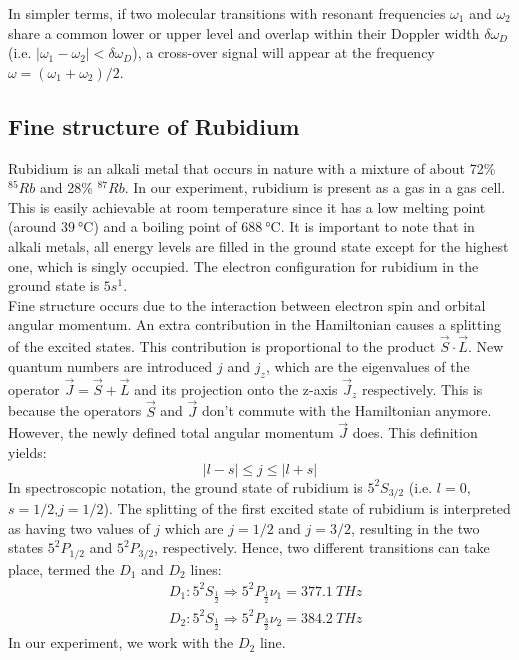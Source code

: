 \documentclass{article}
\begin{document}
In simpler terms, if two molecular transitions with resonant frequencies $\omega_1$ and $\omega_2$ share a common lower or upper level and overlap within their Doppler width $\delta\omega_D$ (i.e. $|{\omega_1 - \omega_2}| <\delta\omega_D$), a cross-over signal will appear at the frequency $\omega = (\omega_1 + \omega_2)/2$.
\pagebreak{}
\subsection{Fine structure of Rubidium}
Rubidium is an alkali metal that occurs in nature with a mixture of about 72\% $^{85}Rb$ and 28\% $^{87}Rb$. In our experiment, rubidium is present as a gas in a gas cell. This is easily achievable at room temperature since it has a low melting point (around $\SI{39}{\celsius}$) and a boiling point of $\SI{688}{\celsius}$. It is important to note that in alkali metals, all energy levels are filled in the ground state except for the highest one, which is singly occupied. The electron configuration for rubidium in the ground state is $5s^1$. 
\\
Fine structure occurs due to the interaction between electron spin and orbital angular momentum. An extra contribution in the Hamiltonian causes a splitting of the excited states. This contribution is proportional to the product $\vec{S}\cdot\vec{L}$. New quantum numbers are introduced $j$ and $j_z$, which are the eigenvalues of the operator $\vec{J}= \vec{S}+\vec{L}$ and its projection onto the z-axis $\vec{J}_z$ respectively. This is because the operators $\vec{S}$ and $\vec{J}$ don't commute with the Hamiltonian anymore. However, the newly defined total angular momentum $\vec{J}$ does. This definition yields: 
\begin{equation}
    |l-s| \leq j \leq|l+s|
\end{equation}
In spectroscopic notation, the ground state of rubidium is $5^2S_{3/2}$ (i.e. $l=0$,$s=1/2$,$j = 1/2$). The splitting of the first excited state of rubidium is interpreted as having two values of $j$ which are $j =1/2$ and $j =3/2$, resulting in the two states $5^2P_{1/2}$ and $5^2P_{3/2}$, respectively. Hence, two different transitions can take place, termed the $D_1$ and $D_2$ lines: 
\begin{equation}
    \begin{aligned}
& D_1: 5^2 S_{\frac{1}{2}} \Rightarrow 5^2 P_{\frac{1}{2}} \nu_{1}=\SI{377.1}{THz} \\
& D_2: 5^2 S_{\frac{1}{2}} \Rightarrow 5^2 P_{\frac{3}{2}} \nu_{2}=\SI{384.2}{THz} 
\end{aligned}
\end{equation}
In our experiment, we work with the $D_2$ line. 
\pagebreak{}
\end{document}
